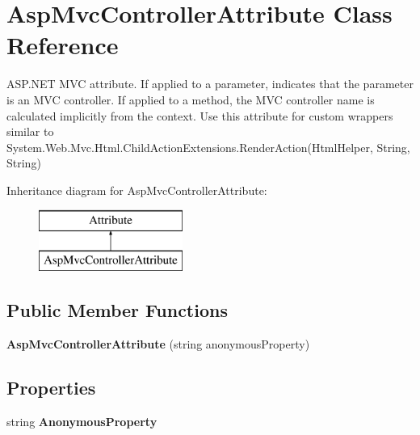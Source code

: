 \hypertarget{class_asp_mvc_controller_attribute}{}\section{Asp\+Mvc\+Controller\+Attribute Class Reference}
\label{class_asp_mvc_controller_attribute}


A\+S\+P.\+N\+E\+T M\+V\+C attribute. If applied to a parameter, indicates that the parameter is an M\+V\+C controller. If applied to a method, the M\+V\+C controller name is calculated implicitly from the context. Use this attribute for custom wrappers similar to {\ttfamily System.\+Web.\+Mvc.\+Html.\+Child\+Action\+Extensions.\+Render\+Action(\+Html\+Helper, String, String)}  


Inheritance diagram for Asp\+Mvc\+Controller\+Attribute\+:\begin{figure}[H]
\begin{center}
\leavevmode
\includegraphics[height=2.000000cm]{class_asp_mvc_controller_attribute}
\end{center}
\end{figure}
\subsection*{Public Member Functions}
\begin{DoxyCompactItemize}
\item 
\hypertarget{class_asp_mvc_controller_attribute_a4e9eab92ec92d827df192a85b653f463}{}{\bfseries Asp\+Mvc\+Controller\+Attribute} (string anonymous\+Property)\label{class_asp_mvc_controller_attribute_a4e9eab92ec92d827df192a85b653f463}

\end{DoxyCompactItemize}
\subsection*{Properties}
\begin{DoxyCompactItemize}
\item 
\hypertarget{class_asp_mvc_controller_attribute_adb49d7099fe6a2366db45aca2e3488ab}{}string {\bfseries Anonymous\+Property}\label{class_asp_mvc_controller_attribute_adb49d7099fe6a2366db45aca2e3488ab}

\end{DoxyCompactItemize}


